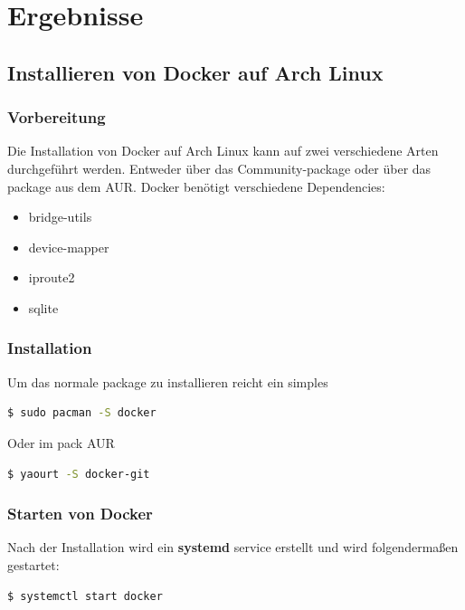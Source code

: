 
\section{Ergebnisse}

	\subsection{Installieren von Docker auf Arch Linux}
		\subsubsection{Vorbereitung}
			Die Installation von Docker auf Arch Linux kann auf zwei verschiedene Arten durchgeführt werden. Entweder über das Community-package oder über das package aus dem AUR. Docker benötigt verschiedene Dependencies:
			\begin{itemize}
				\item bridge-utils
				\item device-mapper
				\item iproute2
				\item sqlite
			\end{itemize}
			
		\subsubsection{Installation}
		Um das normale package zu installieren reicht ein simples
		\begin{lstlisting}[language=bash,caption={Installieren des Docker packages über Pacman}]
		$ sudo pacman -S docker
		\end{lstlisting}
		Oder im pack AUR
		\begin{lstlisting}[language=bash,caption={Docker aus dem AUR}]
		$ yaourt -S docker-git
		\end{lstlisting}
		
		\subsubsection{Starten von Docker}
		Nach der Installation wird ein \textbf{systemd} service erstellt und wird folgendermaßen gestartet:
		\begin{lstlisting}[language=bash,caption={Starten von Docker}]
		$ systemctl start docker
		\end{lstlisting}
		
